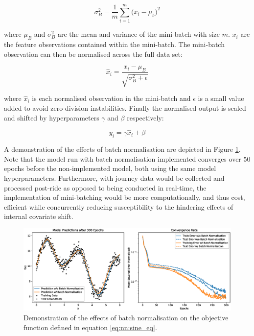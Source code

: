 \documentclass[a4paper, 10pt]{article}
\numberwithin{equation}{section}
\begin{document}
\begin{equation}
    \label{eq:nn:batch_norm_std}
    \sigma^{2}_{B} = \frac{1}{m} \sum^{m}_{i=1} \big(x_{i} - \mu_{b} \big)^2
\end{equation}

where $\mu_{B}$ and $\sigma^{2}_{B}$ are the mean and variance of the mini-batch with size $m$. $x_{i}$ are the feature observations contained within the mini-batch. The mini-batch observation can then be normalised across the full data set:

\vspace{-0.5em}
\begin{equation}
    \label{eq:nn:batch_norm_normalise}
    \hat{x}_{i} = \frac{x_{i} - \mu_{B}}{\sqrt{\sigma^2_{B} + \epsilon}} 
\end{equation}

where $\hat{x}_{i}$ is each normalised observation in the mini-batch and $\epsilon$ is a small value added to avoid zero-division instabilities. Finally the normalised output is scaled and shifted by hyperparameters $\gamma$ and $\beta$ respectively:

\begin{equation}
    \label{eq:nn:batch_norm_scale_shift}
    y_{i} = \gamma\hat{x}_{i} + \beta
\end{equation}

A demonstration of the effects of batch normalisation are depicted in Figure \ref{fig:nn:batch_normalisation}. Note that the model run with batch normalisation implemented converges over 50 epochs before the non-implemented model, both using the same model hyperparameters. Furthermore, with journey data would be collected and processed post-ride as opposed to being conducted in real-time, the implementation of mini-batching would be more computationally, and thus cost, efficient while concurrently reducing susceptibility to the hindering effects of internal covariate shift. \medbreak

\begin{figure}[h!]
    \centering
    \includegraphics[width=\textwidth]{images/NN_ANN/batch_normalisation.eps}
    \caption{Demonstration of the effects of batch normalisation on the objective function defined in equation \ref{eq:nn:sine_eq}.}
    \label{fig:nn:batch_normalisation}
\end{figure}
\end{document}
